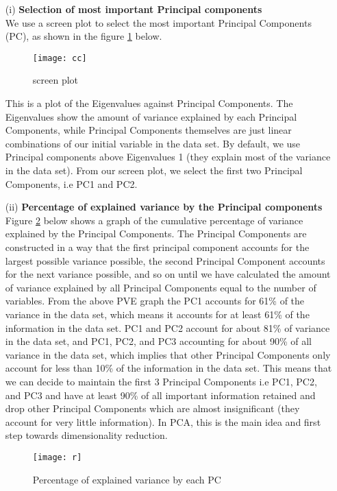 \documentclass[12pt,a4paper]{article}
\begin{document}
\begin{enumerate}
\item[(i)]\textbf{Selection of most important Principal components}\\
We use a screen plot to select the most important Principal Components (PC), as shown in the figure \ref{5} below.
\begin{figure}[H]
\texttt{[image: cc]}
\centering
\caption{screen plot}
\label{5}
\end{figure}
This is a plot of the Eigenvalues against Principal Components. The Eigenvalues show the amount of variance explained by each Principal Components, while Principal Components themselves are just linear combinations of our initial variable in the data set.
By default, we use Principal components above Eigenvalues 1 (they explain most of the variance in the data set).  From our screen plot, we select the first two Principal Components, i.e PC1 and PC2.

\item[(ii)]\textbf{Percentage of explained variance by the Principal components}\\
Figure \ref{6} below shows a graph of the cumulative percentage of variance explained by the Principal Components. The Principal Components are constructed in a way that the first principal component accounts for the largest possible variance possible, the second Principal Component accounts for the next variance possible, and so on until we have calculated the amount of variance explained by all Principal Components equal to the number of variables. From the above PVE graph the PC1 accounts for 61\% of the variance in the data set, which means it accounts for at least 61\% of the information in the data set. PC1 and PC2 account for about 81\% of variance in the data set, and PC1, PC2, and PC3 accounting for about 90\% of all variance in the data set, which implies that other Principal Components only account for less than 10\% of the information in the data set. This means that we can decide to maintain the first 3 Principal Components i.e PC1, PC2, and PC3 and have at least 90\% of all important information retained and drop other Principal Components which are almost insignificant (they account for very little information). In PCA, this is the main idea and first step towards dimensionality reduction.
\begin{figure}[H]
\texttt{[image: r]}
\centering
\caption{Percentage of explained variance by each PC}
\label{6}
\end{figure}


\end{enumerate}
\end{document}
